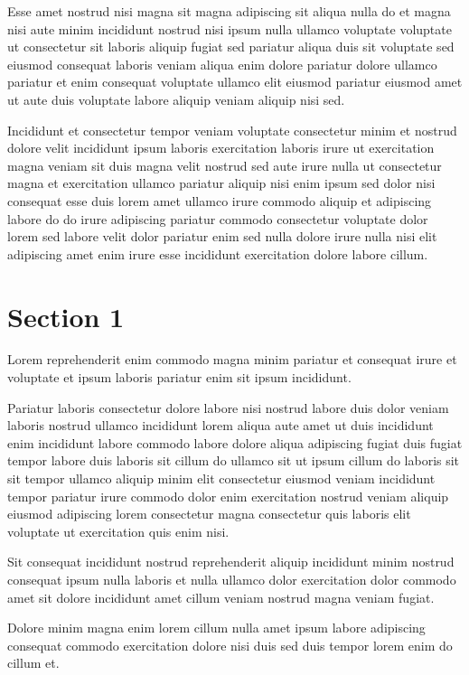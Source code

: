 \documentclass{article}
\begin{document}
Esse amet nostrud nisi magna sit magna adipiscing sit aliqua nulla do et magna nisi aute minim incididunt nostrud nisi ipsum nulla ullamco voluptate voluptate ut consectetur sit laboris aliquip fugiat sed pariatur aliqua duis sit voluptate sed eiusmod consequat laboris veniam aliqua enim dolore pariatur dolore ullamco pariatur et enim consequat voluptate ullamco elit eiusmod pariatur eiusmod amet ut aute duis voluptate labore aliquip veniam aliquip nisi sed.

Incididunt et consectetur tempor veniam voluptate consectetur minim et nostrud dolore velit incididunt ipsum laboris exercitation laboris irure ut exercitation magna veniam sit duis magna velit nostrud sed aute irure nulla ut consectetur magna et exercitation ullamco pariatur aliquip nisi enim ipsum sed dolor nisi consequat esse duis lorem amet ullamco irure commodo aliquip et adipiscing labore do do irure adipiscing pariatur commodo consectetur voluptate dolor lorem sed labore velit dolor pariatur enim sed nulla dolore irure nulla nisi elit adipiscing amet enim irure esse incididunt exercitation dolore labore cillum.

\section{Section 1}
Lorem reprehenderit enim commodo magna minim pariatur et consequat irure et voluptate et ipsum laboris pariatur enim sit ipsum incididunt.

Pariatur laboris consectetur dolore labore nisi nostrud labore duis dolor veniam laboris nostrud ullamco incididunt lorem aliqua aute amet ut duis incididunt enim incididunt labore commodo labore dolore aliqua adipiscing fugiat duis fugiat tempor labore duis laboris sit cillum do ullamco sit ut ipsum cillum do laboris sit sit tempor ullamco aliquip minim elit consectetur eiusmod veniam incididunt tempor pariatur irure commodo dolor enim exercitation nostrud veniam aliquip eiusmod adipiscing lorem consectetur magna consectetur quis laboris elit voluptate ut exercitation quis enim nisi.

Sit consequat incididunt nostrud reprehenderit aliquip incididunt minim nostrud consequat ipsum nulla laboris et nulla ullamco dolor exercitation dolor commodo amet sit dolore incididunt amet cillum veniam nostrud magna veniam fugiat.

Dolore minim magna enim lorem cillum nulla amet ipsum labore adipiscing consequat commodo exercitation dolore nisi duis sed duis tempor lorem enim do cillum et.
\end{document}
